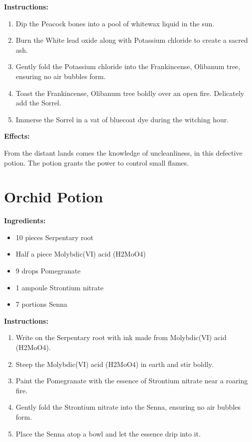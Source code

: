 \documentclass{article}
\begin{document}
\textbf{Instructions:}

\begin{enumerate}
  \item Dip the Peacock bones into a pool of whitewax liquid in the sun.
  \item Burn the White lead oxide along with Potassium chloride to create a sacred ash.
  \item Gently fold the Potassium chloride into the Frankincense, Olibanum tree, ensuring no air bubbles form.
  \item Toast the Frankincense, Olibanum tree boldly over an open fire. Delicately add the Sorrel.
  \item Immerse the Sorrel in a vat of bluecoat dye during the witching hour.
\end{enumerate}

\textbf{Effects:}

From the distant lands comes the knowledge of uncleanliness, in this defective potion. The potion grants the power to control small flames.

\newpage
\section*{Orchid Potion}

\textbf{Ingredients:}

\begin{itemize}
  \item 10 pieces Serpentary root
  \item Half a piece Molybdic(VI) acid (H2MoO4)
  \item 9 drops Pomegranate
  \item 1 ampoule Strontium nitrate
  \item 7 portions Senna
\end{itemize}

\textbf{Instructions:}

\begin{enumerate}
  \item Write on the Serpentary root with ink made from Molybdic(VI) acid (H2MoO4).
  \item Steep the Molybdic(VI) acid (H2MoO4) in earth and stir boldly.
  \item Paint the Pomegranate with the essence of Strontium nitrate near a roaring fire.
  \item Gently fold the Strontium nitrate into the Senna, ensuring no air bubbles form.
  \item Place the Senna atop a bowl and let the essence drip into it.
\end{enumerate}
\end{document}
